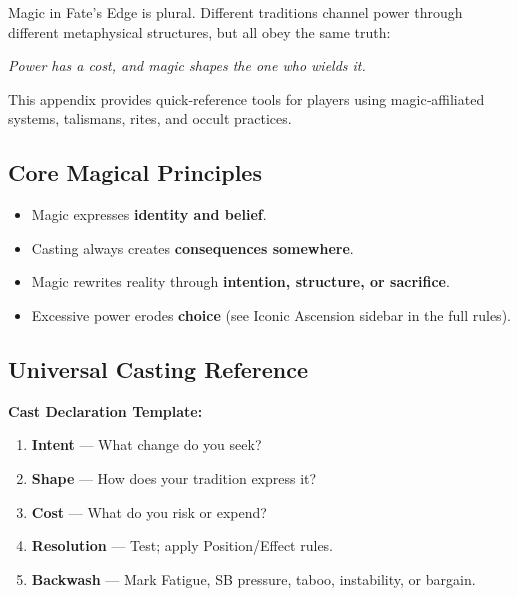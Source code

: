 Magic in Fate's Edge is plural.  
Different traditions channel power through different metaphysical structures, but all obey the same truth:

\begin{center}
\emph{Power has a cost, and magic shapes the one who wields it.}
\end{center}

This appendix provides quick‑reference tools for players using magic‑affiliated systems, talismans, rites, and occult practices.

\subsection{Core Magical Principles}
\begin{tcolorbox}[colback=white,colframe=black,left=1em,right=1em]
\begin{itemize}[noitemsep]
    \item Magic expresses \textbf{identity and belief}.
    \item Casting always creates \textbf{consequences somewhere}.
    \item Magic rewrites reality through \textbf{intention, structure, or sacrifice}.
    \item Excessive power erodes \textbf{choice} (see Iconic Ascension sidebar in the full rules).
\end{itemize}
\end{tcolorbox}

\subsection{Universal Casting Reference}
\begin{tcolorbox}[colback=gray!5,colframe=gray!60]
\textbf{Cast Declaration Template:}
\begin{enumerate}[noitemsep]
    \item \textbf{Intent} --- What change do you seek?
    \item \textbf{Shape} --- How does your tradition express it?
    \item \textbf{Cost} --- What do you risk or expend?
    \item \textbf{Resolution} --- Test; apply Position/Effect rules.
    \item \textbf{Backwash} --- Mark Fatigue, SB pressure, taboo, instability, or bargain.
\end{enumerate}
\end{tcolorbox}

